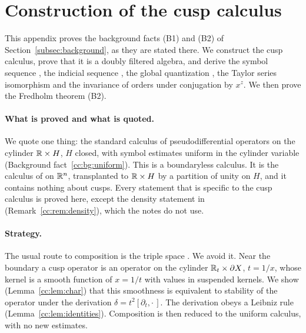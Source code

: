 \section{Construction of the cusp calculus}\label{cc:sec:cusp}
\providecommand{\ccK}{\mathfrak K}
\providecommand{\Psiu}{\Psi_{\mathrm u}}
\providecommand{\PsicT}{\Psi_{c,T}}
\providecommand{\ccM}{\mathcal M}
\providecommand{\ffc}{\mathrm{ff}_c}
\providecommand{\ffb}{\mathrm{ff}_b}
\providecommand{\adt}{\operatorname{ad}_t}
\providecommand{\CIb}{C^\infty_{\mathrm b}}
\providecommand{\ccS}{S_{\mathrm{cl}}}

This appendix proves the background facts (B1) and (B2) of
Section~\ref{subsec:background}, as they are stated there. We construct
the cusp calculus, prove that it is a doubly filtered algebra, and derive
the symbol sequence \cite[(11)]{MN}, the indicial sequence
\cite[(12)]{MN}, the global quantization \cite[Prop.~24]{MN}, the Taylor
series isomorphism \cite[Prop.~25]{MN} and the invariance of orders under
conjugation by \(x^z\). We then prove the Fredholm theorem (B2).

\paragraph{What is proved and what is quoted.} We quote one thing: the
standard calculus of pseudodifferential operators on the cylinder
\(\mathbb R\times H\), \(H\) closed, with symbol estimates uniform in the
cylinder variable (Background fact~\ref{cc:bg:uniform}). This is a
boundaryless calculus. It is the calculus of \cite[Ch.~2]{MelroseMicro}
on \(\mathbb R^n\), transplanted to \(\mathbb R\times H\) by a partition of unity on
\(H\), and it contains nothing about cusps. Every statement that is
specific to the cusp calculus is proved here, except the density
statement in \cite[Prop.~26]{MN} (Remark~\ref{cc:rem:density}), which the
notes do not use.

\paragraph{Strategy.} The usual route to composition is the triple space
\cite{MazzeoMelrose}. We avoid it. Near the boundary a cusp operator is an
operator on the cylinder \(\mathbb R_t\times\partial X\), \(t=1/x\), whose kernel
is a smooth function of \(x=1/t\) with values in suspended kernels. We
show (Lemma~\ref{cc:lem:char}) that this smoothness is equivalent to
stability of the operator under the derivation \(\delta=t^2[\partial_t,
\cdot\,]\). The derivation obeys a Leibniz rule
(Lemma~\ref{cc:lem:identities}). Composition is then reduced to the
uniform calculus, with no new estimates.

